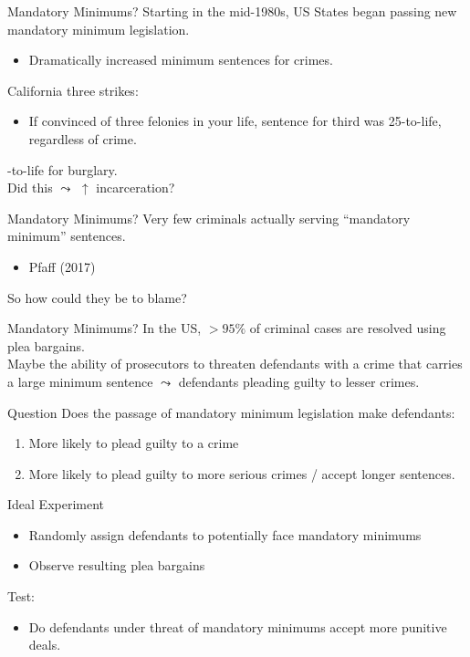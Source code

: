 \documentclass[11pt]{beamer}
\begin{document}
\begin{frame}[c]{Mandatory Minimums?}
Starting in the mid-1980s, US States began passing new mandatory minimum legislation.
\begin{itemize}
    \pause \item Dramatically increased minimum sentences for crimes.
\end{itemize}
\pause California three strikes:
\begin{itemize}
    \item If convinced of three felonies in your life, sentence for third was 25-to-life, regardless of crime.
\end{itemize}
-to-life for burglary.\\
\pause \vspace{1cm}
Did this $\leadsto$ $\uparrow$ incarceration?
\end{frame}

\begin{frame}[c]{Mandatory Minimums?}
Very few criminals actually serving ``mandatory minimum'' sentences.
\begin{itemize}
    \item {\color{gray} Pfaff (2017)}
\end{itemize}
\pause So how could they be to blame?
\end{frame}

\begin{frame}[c]{Mandatory Minimums?}
In the US, $> 95\%$ of criminal cases are resolved using plea bargains. \\
\vspace{1cm}
\pause Maybe the ability of prosecutors to \alert{threaten} defendants with a crime that carries a large minimum sentence $\leadsto$ defendants pleading guilty to lesser crimes.
\end{frame}

\begin{frame}[c]{Question}
    Does the passage of \alert{mandatory minimum legislation} make defendants:
    \begin{enumerate}
        \item More likely to plead guilty to a crime
        \item More likely to plead guilty to more serious crimes / accept longer sentences.
    \end{enumerate}
\end{frame}


\begin{frame}[c]{Ideal Experiment}
\begin{itemize}
    \item Randomly assign defendants to \alert{potentially} face mandatory minimums
    \pause \item Observe resulting plea bargains
\end{itemize}
\pause Test:
\begin{itemize}
    \item Do defendants under \alert{threat} of mandatory minimums accept more punitive deals.
\end{itemize}
\end{frame}
\end{document}

